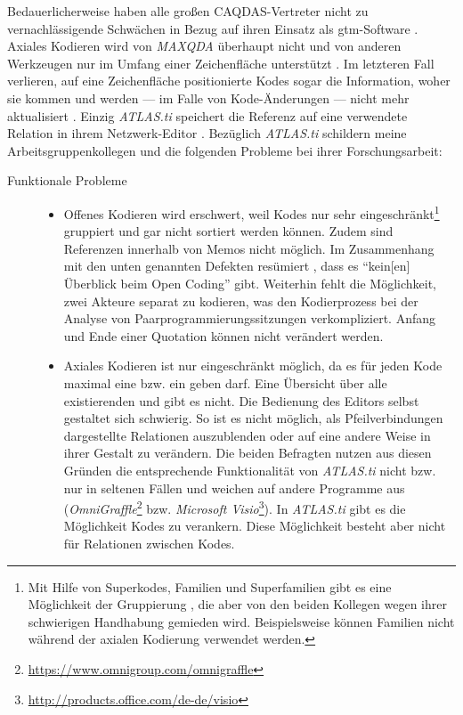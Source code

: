 Bedauerlicherweise haben alle großen CAQDAS-Vertreter nicht zu vernachlässigende Schwächen in Bezug auf ihren Einsatz als \gls{gtm}-Software \citep{ann2007using}. Axiales Kodieren wird von \textit{MAXQDA} überhaupt nicht \citep{Wolf:2014vv} und von anderen Werkzeugen nur im Umfang einer Zeichenfläche unterstützt \citep{ann2007using}. Im letzteren Fall verlieren, auf eine Zeichenfläche positionierte Kodes sogar die Information, woher sie kommen und werden --- im Falle von Kode-Änderungen --- nicht mehr aktualisiert . Einzig \textit{ATLAS.ti} speichert die Referenz auf eine verwendete Relation in ihrem Netzwerk-Editor \citep{ann2007using}. Bezüglich \textit{ATLAS.ti} schildern meine Arbeitsgruppenkollegen \cite{Schenk:3LdEjzOu} und \cite{Zieris:yCXyxVc9} die folgenden Probleme bei ihrer Forschungsarbeit:

\begin{description}
  \item[Funktionale Probleme] \hfill
  \begin{itemize}
    \item Offenes Kodieren wird erschwert, weil Kodes nur sehr eingeschränkt\footnote{Mit Hilfe von Superkodes, Familien und Superfamilien gibt es eine Möglichkeit der Gruppierung \citep{MuhlmeyerMentzel:2011vs}, die aber von den beiden Kollegen wegen ihrer schwierigen Handhabung gemieden wird. Beispielsweise können Familien nicht während der axialen Kodierung verwendet werden.} gruppiert und gar nicht sortiert werden können. Zudem sind Referenzen innerhalb von Memos nicht möglich. Im Zusammenhang mit den unten genannten Defekten resümiert \cite{Zieris:yCXyxVc9}, dass es ``kein[en] Überblick beim Open Coding'' gibt. Weiterhin fehlt die Möglichkeit, zwei Akteure separat zu kodieren, was den Kodierprozess bei der Analyse von Paarprogrammierungssitzungen verkompliziert. Anfang und Ende einer Quotation können nicht verändert werden.
    \item Axiales Kodieren ist nur eingeschränkt möglich, da es für jeden Kode maximal eine  bzw. ein  geben darf. Eine Übersicht über alle existierenden  und  gibt es nicht. Die Bedienung des Editors selbst gestaltet sich schwierig. So ist es nicht möglich, als Pfeilverbindungen dargestellte Relationen auszublenden oder auf eine andere Weise in ihrer Gestalt zu verändern. Die beiden Befragten nutzen aus diesen Gründen die entsprechende Funktionalität von \textit{ATLAS.ti} nicht bzw. nur in seltenen Fällen und weichen auf andere Programme aus (\textit{OmniGraffle}\footnote{\url{https://www.omnigroup.com/omnigraffle}} bzw. \textit{Microsoft Visio}\footnote{\url{http://products.office.com/de-de/visio}}). In \textit{ATLAS.ti} gibt es die Möglichkeit Kodes zu verankern. Diese Möglichkeit besteht aber nicht für Relationen zwischen Kodes.
  \end{itemize}
  

\end{description}
